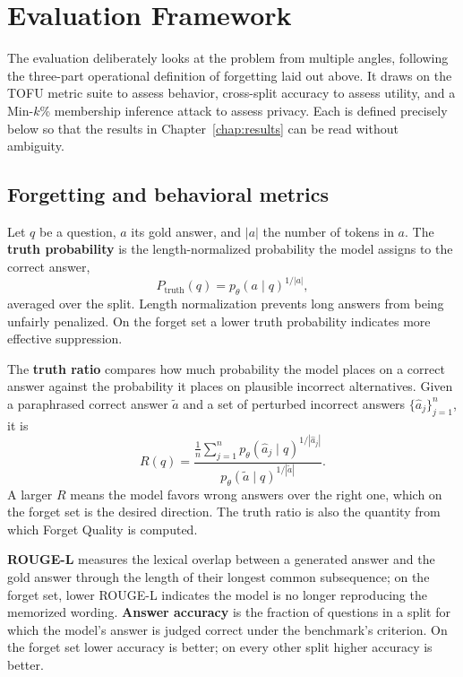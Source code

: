 \documentclass[a4paper,12pt]{report}
\begin{document}
\section{Evaluation Framework}
\label{sec:eval-framework}
The evaluation deliberately looks at the problem from multiple angles, following the three-part operational definition of forgetting laid out above. It draws on the TOFU metric suite to assess behavior, cross-split accuracy to assess utility, and a Min-$k$\% membership inference attack to assess privacy. Each is defined precisely below so that the results in Chapter~\ref{chap:results} can be read without ambiguity.

\subsection{Forgetting and behavioral metrics}
Let $q$ be a question, $a$ its gold answer, and $|a|$ the number of tokens in $a$. The \textbf{truth probability} is the length-normalized probability the model assigns to the correct answer,
\begin{equation}
	P_{\mathrm{truth}}(q) = p_\theta(a \mid q)^{1/|a|},
	\label{eq:truthprob}
\end{equation}
averaged over the split. Length normalization prevents long answers from being unfairly penalized. On the forget set a lower truth probability indicates more effective suppression.

The \textbf{truth ratio} compares how much probability the model places on a correct answer against the probability it places on plausible incorrect alternatives. Given a paraphrased correct answer $\tilde{a}$ and a set of perturbed incorrect answers $\{\hat{a}_j\}_{j=1}^{n}$, it is
\begin{equation}
	R(q) = \frac{\frac{1}{n}\sum_{j=1}^{n} p_\theta(\hat{a}_j \mid q)^{1/|\hat{a}_j|}}{p_\theta(\tilde{a} \mid q)^{1/|\tilde{a}|}}.
	\label{eq:truthratio}
\end{equation}
A larger $R$ means the model favors wrong answers over the right one, which on the forget set is the desired direction. The truth ratio is also the quantity from which Forget Quality is computed.

\textbf{ROUGE-L} measures the lexical overlap between a generated answer and the gold answer through the length of their longest common subsequence; on the forget set, lower ROUGE-L indicates the model is no longer reproducing the memorized wording. \textbf{Answer accuracy} is the fraction of questions in a split for which the model's answer is judged correct under the benchmark's criterion. On the forget set lower accuracy is better; on every other split higher accuracy is better.
\end{document}
